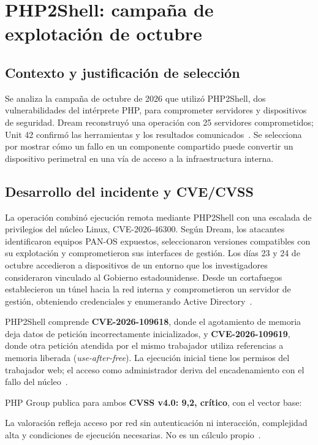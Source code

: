 \chapter{PHP2Shell: campaña de explotación de octubre}
\label{chap:incidente1}

\section{Contexto y justificación de selección}
Se analiza la campaña de octubre de 2026 que utilizó PHP2Shell,
dos vulnerabilidades del intérprete PHP, para comprometer
servidores y dispositivos de seguridad. Dream reconstruyó una
operación con 25 servidores comprometidos; Unit 42 confirmó las
herramientas y los resultados comunicados~\cite{dream2026php,unit422026php}.
Se selecciona por mostrar cómo un fallo en un componente compartido
puede convertir un dispositivo perimetral en una vía de acceso
a la infraestructura interna.

\section{Desarrollo del incidente y CVE/CVSS}
La operación combinó ejecución remota mediante PHP2Shell con
una escalada de privilegios del núcleo Linux,
CVE-2026-46300. Según Dream, los atacantes identificaron equipos
PAN-OS expuestos, seleccionaron versiones compatibles con su
explotación y comprometieron sus interfaces de gestión.
Los días 23 y 24 de octubre accedieron a dispositivos de un
entorno que los investigadores consideraron vinculado al
Gobierno estadounidense. Desde un cortafuegos establecieron
un túnel hacia la red interna y comprometieron un servidor
de gestión, obteniendo credenciales y enumerando
Active Directory~\cite{dream2026php}.

PHP2Shell comprende \textbf{CVE-2026-109618}, donde el agotamiento
de memoria deja datos de petición incorrectamente inicializados,
y \textbf{CVE-2026-109619}, donde otra petición atendida por el mismo
trabajador utiliza referencias a memoria liberada
(\textit{use-after-free}). La ejecución inicial tiene los permisos
del trabajador web; el acceso como administrador deriva del
encadenamiento con el fallo del núcleo~\cite{php2026oom,php2026stale,dream2026php}.

PHP Group publica para ambos \textbf{CVSS v4.0: 9,2, crítico},
con el vector base:\par
{}\par
La valoración refleja acceso por red sin autenticación ni
interacción, complejidad alta y condiciones de ejecución
necesarias. No es un cálculo propio~\cite{php2026oom,php2026stale}.

